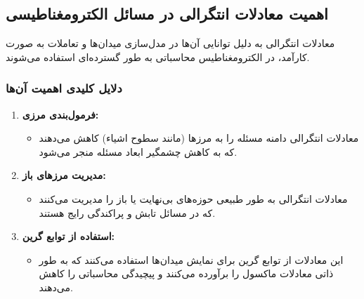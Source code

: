 \documentclass[12pt,a4paper]{article}
\begin{document}
\subsection{اهمیت معادلات انتگرالی در مسائل الکترومغناطیسی}
معادلات انتگرالی به دلیل توانایی آن‌ها در مدل‌سازی میدان‌ها و تعاملات به صورت کارآمد، در الکترومغناطیس محاسباتی به طور گسترده‌ای استفاده می‌شوند.

\subsubsection{دلایل کلیدی اهمیت آن‌ها}
\begin{enumerate}
    \item \textbf{فرمول‌بندی مرزی:}
          \begin{itemize}
              \item معادلات انتگرالی دامنه مسئله را به مرزها (مانند سطوح اشیاء) کاهش می‌دهند که به کاهش چشمگیر ابعاد مسئله منجر می‌شود.
          \end{itemize}
    \item \textbf{مدیریت مرزهای باز:}
          \begin{itemize}
              \item معادلات انتگرالی به طور طبیعی حوزه‌های بی‌نهایت یا باز را مدیریت می‌کنند که در مسائل تابش و پراکندگی رایج هستند.
          \end{itemize}
    \item \textbf{استفاده از توابع گرین:}
          \begin{itemize}
              \item این معادلات از توابع گرین برای نمایش میدان‌ها استفاده می‌کنند که به طور ذاتی معادلات ماکسول را برآورده می‌کنند و پیچیدگی محاسباتی را کاهش می‌دهند.
          \end{itemize}
\end{enumerate}

\newpage
\end{document}
